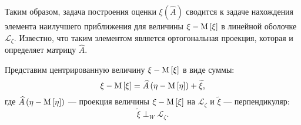 Таким образом, задача построения оценки $\xi(\widehat{A})$ сводится к задаче нахождения элемента наилучшего приближения для величины $\xi - \mathrm{M} \left [ \xi \right ]$
в линейной оболочке $\mathcal{L}_\zeta$. Известно, что таким элементом является ортогональная проекция, которая и определяет матрицу $\widehat{A}$.

Представим центрированную величину $\xi - \mathrm{M} \left [ \xi \right ]$ в виде суммы:
\begin{equation} \label{equation:filtering:in_states:variable:state_decomposition}
	\xi - \mathrm{M} \left [ \xi \right ] = \widehat{A} \left ( \eta - \mathrm{M} \left [ \eta \right ] \right ) + \widetilde{\xi} ,
\end{equation}
где $\widehat{A} \left ( \eta - \mathrm{M} \left [ \eta \right ] \right )$ --- проекция величины $\xi - \mathrm{M} \left [ \xi \right ]$ на $\mathcal{L}_\zeta$ и $\widetilde{\xi}$ --- перпендикуляр:
$$
	\widetilde{\xi} \perp_W \mathcal{L}_\zeta .
$$

